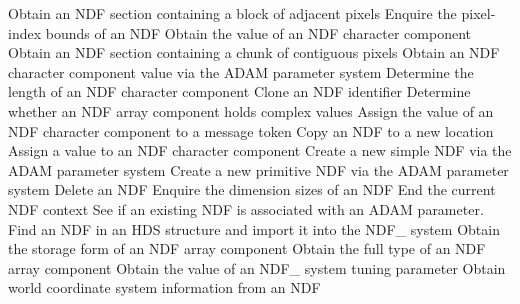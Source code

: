 \begin{latexonly}
            {Obtain an NDF section containing a block of adjacent pixels}
            {Enquire the pixel-index bounds of an NDF}
            {Obtain the value of an NDF character component}
            {Obtain an NDF section containing a chunk of contiguous pixels}
            {Obtain an NDF character component value via the ADAM parameter system}
            {Determine the length of an NDF character component}
            {Clone an NDF identifier}
            {Determine whether an NDF array component holds complex values}
            {Assign the value of an NDF character component to a message token}
            {Copy an NDF to a new location}
            {Assign a value to an NDF character component}
            {Create a new simple NDF via the ADAM parameter system}
            {Create a new primitive NDF via the ADAM parameter system}
            {Delete an NDF}
            {Enquire the dimension sizes of an NDF}
            {End the current NDF context}
            {See if an existing NDF is associated with an ADAM parameter.}
            {Find an NDF in an HDS structure and import it into the NDF\_ system}
            {Obtain the storage form of an NDF array component}
            {Obtain the full type of an NDF array component}
            {Obtain the value of an NDF\_ system tuning parameter}
            {Obtain world coordinate system information from an NDF}

\end{latexonly}
